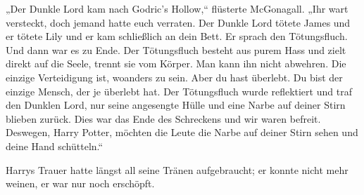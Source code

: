 „Der Dunkle Lord kam nach Godric’s Hollow,“ flüsterte McGonagall. „Ihr wart versteckt, doch jemand hatte euch verraten. Der Dunkle Lord tötete James und er tötete Lily und er kam schließlich an dein Bett. Er sprach den Tötungsfluch. Und dann war es zu Ende. Der Tötungsfluch besteht aus purem Hass und zielt direkt auf die Seele, trennt sie vom Körper. Man kann ihn nicht abwehren. Die einzige Verteidigung ist, woanders zu sein. Aber du hast überlebt. Du bist der einzige Mensch, der je überlebt hat. Der Tötungsfluch wurde reflektiert und traf den Dunklen Lord, nur seine angesengte Hülle und eine Narbe auf deiner Stirn blieben zurück. Dies war das Ende des Schreckens und wir waren befreit. Deswegen, Harry Potter, möchten die Leute die Narbe auf deiner Stirn sehen und deine Hand schütteln.“

Harrys Trauer hatte längst all seine Tränen aufgebraucht; er konnte nicht mehr weinen, er war nur noch erschöpft.

